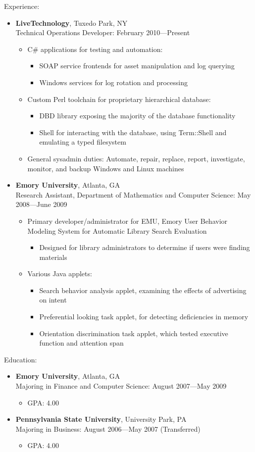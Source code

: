 \documentclass[10pt,oneside]{article}
\newenvironment{ressection}[1]{
	\vspace{1pt}
	{\fontfamily{phv}\selectfont\Large#1}
	\begin{itemize}
	\vspace{1pt}
}{
	\end{itemize}
}
\newcommand{\ressubitem}[1]{
	\vspace{-2pt}
	\item \begin{flushleft} #1 \end{flushleft}
}
\newcommand{\ressubsubitem}[1]{
	\vspace{-2pt}
    \begin{itemize} \item #1 \end{itemize}
	\vspace{-2pt}
}
\newcommand{\resbigitem}[3]{
	\vspace{-5pt}
	\item
	\textbf{#1}, #2 \\
	#3
    \vspace{-1pt}
}
\newenvironment{ressubsec}[3]{
	\resbigitem{#1}{#2}{#3}
	\vspace{-2pt}
	\begin{itemize}
}{
	\end{itemize}
}
\begin{document}
\begin{ressection}{Experience:}

	\begin{ressubsec}{LiveTechnology}{Tuxedo Park, NY}{Technical Operations Developer: February 2010---Present}
        \ressubitem{C\# applications for testing and automation:}
            \ressubsubitem{SOAP service frontends for asset manipulation and log querying}
            \ressubsubitem{Windows services for log rotation and processing}
		\ressubitem{Custom Perl toolchain for proprietary hierarchical database:}
            \ressubsubitem{DBD library exposing the majority of the database functionality}
            \ressubsubitem{Shell for interacting with the database, using Term::Shell and emulating a typed filesystem}
        \ressubitem{General sysadmin duties: Automate, repair, replace, report, investigate, monitor, and backup Windows and Linux machines}
    \end{ressubsec}

	\begin{ressubsec}{Emory University}{Atlanta, GA}{Research Assistant, Department of Mathematics and Computer Science: May 2008---June 2009}
		\ressubitem{Primary developer/administrator for EMU, Emory User Behavior Modeling System for Automatic Library Search Evaluation}
        \ressubsubitem{Designed for library administrators to determine if users were finding materials}
        \ressubitem{Various Java applets:}
		\ressubsubitem{Search behavior analysis applet, examining the effects of advertising on intent} 
		\ressubsubitem{Preferential looking task applet, for detecting deficiencies in memory}
        \ressubsubitem{Orientation discrimination task applet, which tested executive function and attention span}
	\end{ressubsec}

\end{ressection}

\begin{ressection}{Education:}

	\begin{ressubsec}{Emory University}{Atlanta, GA}{Majoring in Finance and Computer Science: August 2007---May 2009}
		\ressubitem{GPA: 4.00}
	\end{ressubsec}

	\begin{ressubsec}{Pennsylvania State University}{University Park, PA}{Majoring in Business: August 2006---May 2007 (Transferred)}
		\ressubitem{GPA: 4.00}
	\end{ressubsec}

\end{ressection}
\end{document}

